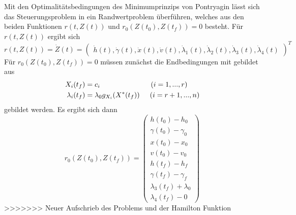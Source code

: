Mit den Optimalitätsbedingungen des Minimumprinzips von Pontryagin lässt sich das Steuerungsproblem in ein Randwertproblem überführen, welches aus den beiden Funktionen $r(t,Z(t))$ und $r_0(Z(t_0),Z(t_f)) = 0$ besteht. Für $r(t,Z(t))$ ergibt sich \[r(t,Z(t)) = \dot{Z}(t) = \begin{pmatrix}
\dot{h}(t),\dot{\gamma}(t),\dot{x}(t),\dot{v}(t),\dot{\lambda}_1(t),\dot{\lambda}_2(t),\dot{\lambda}_3(t),\dot{\lambda}_4(t)
\end{pmatrix}^T\] Für $r_0(Z(t_0),Z(t_f)) = 0$ müssen zunächst die Endbedingungen mit gebildet aus 
\[\begin{split}
X_i(t_f) &= c_i \hspace{25mm} (i=1,...,r) \\\
\lambda_i(t_f) &= \lambda_0 g_{X_i}(X^{\ast}(t_f)) \hspace{5mm} (i=r+1,...,n)
\end{split}\] gebildet werden. Es ergibt sich dann \[r_0(Z(t_0),Z(t_f)) = \begin{pmatrix}
h(t_0) - h_0 \\ 
\gamma(t_0) - \gamma_0 \\
x(t_0) - x_0 \\ 
v(t_0) - v_0 \\ 
h(t_f) - h_f \\ 
\gamma(t_f) - \gamma_f \\
\lambda_3(t_f) + \lambda_0 \\ 
\lambda_4(t_f) - 0
\end{pmatrix}\]
>>>>>>> Neuer Aufschrieb des Problems und der Hamilton Funktion
